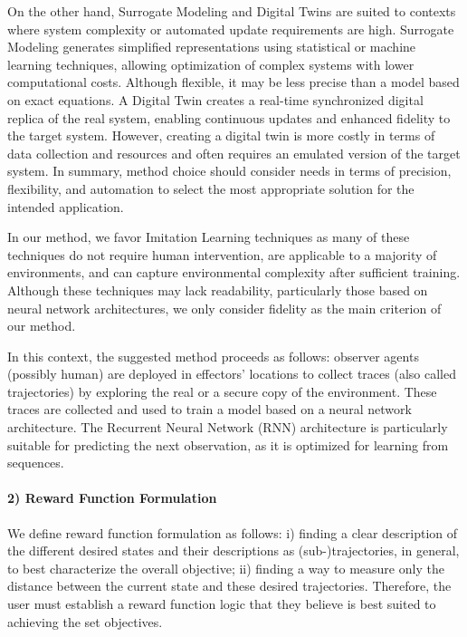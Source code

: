 \documentclass[sigconf,anonymous]{aamas}
\begin{document}
On the other hand, Surrogate Modeling and Digital Twins are suited to contexts where system complexity or automated update requirements are high. Surrogate Modeling generates simplified representations using statistical or machine learning techniques, allowing optimization of complex systems with lower computational costs. Although flexible, it may be less precise than a model based on exact equations. A Digital Twin creates a real-time synchronized digital replica of the real system, enabling continuous updates and enhanced fidelity to the target system. However, creating a digital twin is more costly in terms of data collection and resources and often requires an emulated version of the target system. In summary, method choice should consider needs in terms of precision, flexibility, and automation to select the most appropriate solution for the intended application.

In our method, we favor Imitation Learning techniques as many of these techniques do not require human intervention, are applicable to a majority of environments, and can capture environmental complexity after sufficient training. Although these techniques may lack readability, particularly those based on neural network architectures, we only consider fidelity as the main criterion of our method.

In this context, the suggested method proceeds as follows: observer agents (possibly human) are deployed in effectors' locations to collect traces (also called trajectories) by exploring the real or a secure copy of the environment. These traces are collected and used to train a model based on a neural network architecture. The Recurrent Neural Network (RNN) architecture is particularly suitable for predicting the next observation, as it is optimized for learning from sequences.

\paragraph{\textbf{2) Reward Function Formulation}} \quad

\noindent We define reward function formulation as follows: \quad i) finding a clear description of the different desired states and their descriptions as (sub-)trajectories, in general, to best characterize the overall objective; \quad ii) finding a way to measure only the distance between the current state and these desired trajectories. Therefore, the user must establish a reward function logic that they believe is best suited to achieving the set objectives.
\end{document}
